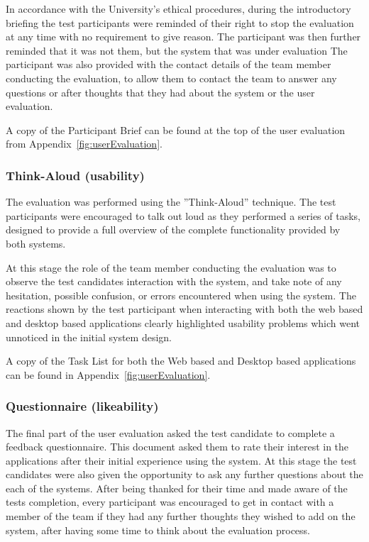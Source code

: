 In accordance with the University's ethical procedures, during the introductory
briefing the test participants were reminded of their right to stop the
evaluation at any time with no requirement to give reason. The participant was
then further reminded that it was not them, but the system that was under
evaluation The participant was also provided with the contact details of the
team member conducting the evaluation, to allow them to contact the team to
answer any questions or after thoughts that they had about the system or the
user evaluation.

A copy of the Participant Brief can be found at the top of the user evaluation
from Appendix~\ref{fig:userEvaluation}.

\subsubsection{Think-Aloud (usability)}

The evaluation was performed using the ”Think-Aloud” technique. The test
participants were encouraged to talk out loud as they performed a series of
tasks, designed to provide a full overview of the complete functionality
provided by both systems.

At this stage the role of the team member conducting the evaluation was to
observe the test candidates interaction with the system, and take note of any
hesitation, possible confusion, or errors encountered when using the system.
The reactions shown by the test participant when interacting with both the web
based and desktop based applications clearly highlighted usability problems
which went unnoticed in the initial system design.

A copy of the Task List for both the Web based and Desktop based applications
can be found in Appendix~\ref{fig:userEvaluation}.

\subsubsection{Questionnaire (likeability)}

The final part of the user evaluation asked the test candidate to complete a
feedback questionnaire. This document asked them to rate their interest in the
applications after their initial experience using the system. At this stage the
test candidates were also given the opportunity to ask any further questions
about the each of the systems. After being thanked for their time and made
aware of the tests completion, every participant was encouraged to get in
contact with a member of the team if they had any further thoughts they wished
to add on the system, after having some time to think about the evaluation
process.

